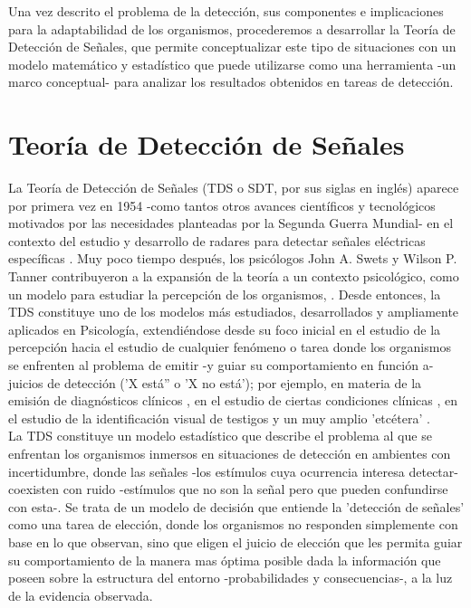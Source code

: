 Una vez descrito el problema de la detección, sus componentes e implicaciones para la adaptabilidad de los organismos, procederemos a desarrollar la Teoría de Detección de Señales, que permite conceptualizar este tipo de situaciones con un modelo matemático y estadístico que puede utilizarse como una herramienta -un marco conceptual- para analizar los resultados obtenidos en tareas de detección.\\

\section{Teoría de Detección de Señales}

La Teoría de Detección de Señales (TDS o SDT, por sus siglas en inglés) aparece por primera vez en 1954 -como tantos otros avances científicos y tecnológicos motivados por las necesidades planteadas por la Segunda Guerra Mundial- en el contexto del estudio y desarrollo de radares para detectar señales eléctricas específicas \parencite{Peterson1954}. Muy poco tiempo después, los psicólogos John A. Swets y Wilson P. Tanner contribuyeron a la expansión de la teoría a un contexto psicológico, como un modelo para estudiar la percepción de los organismos, \parencite{Tanner1954, Swets1961}. Desde entonces, la TDS constituye uno de los modelos más estudiados, desarrollados y ampliamente aplicados en Psicología, extendiéndose desde su foco inicial en el estudio de la percepción \parencite{Rosenholtz2001, Pessoa2005, Wallis2007} hacia el estudio de cualquier fenómeno o tarea donde los organismos se enfrenten al problema de emitir -y guiar su comportamiento en función a- juicios de detección ('X está'' o 'X no está'); por ejemplo, en materia de la emisión de diagnósticos clínicos \parencite{Grossberg1978, Swets2000, Boutis2010}, en el estudio de ciertas condiciones clínicas \parencite{Westermann2010, Bonnel2003, Brown1994, Naliboff1981}, en el estudio de la identificación visual de testigos \parencite{Gronlund2014, Wixted2014, Wixted2016} y un muy amplio 'etcétera' \parencite{Gordon1974, Nuechterlein1983, Harvey1992, Verghese2001}.\\ 

La TDS constituye un modelo estadístico que describe el problema al que se enfrentan los organismos inmersos en situaciones de detección en ambientes con incertidumbre, donde las señales -los estímulos cuya ocurrencia interesa detectar- coexisten con ruido -estímulos que no son la señal pero que pueden confundirse con esta-. Se trata de un modelo de decisión que entiende la 'detección de señales' como una tarea de elección, donde los organismos no responden simplemente con base en lo que observan, sino que eligen el juicio de elección que les permita guiar su comportamiento de la manera mas óptima posible dada la información que poseen sobre la estructura del entorno -probabilidades y consecuencias-, a la luz de la evidencia observada.\\

